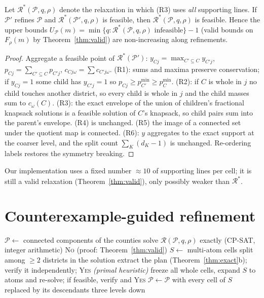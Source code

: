 \begin{theorem}\label{thm:mono}
Let $\mathcal R^*(\mathcal P,q,\rho)$ denote the relaxation in which (R3) uses \emph{all} supporting lines. If $\mathcal P'$ refines $\mathcal P$ and $\mathcal R^*(\mathcal P',q,\rho)$ is feasible, then $\mathcal R^*(\mathcal P,q,\rho)$ is feasible. Hence the upper bounds $U_{\mathcal P}(m)=\min\{q:\mathcal R^*(\mathcal P,q,\rho)\text{ infeasible}\}-1$ (valid bounds on $F_\rho(m)$ by Theorem~\ref{thm:valid}) are non-increasing along refinements.
\end{theorem}
\begin{proof}
Aggregate a feasible point of $\mathcal R^*(\mathcal P')$: $y_{Cj}=\max_{C'\subseteq C}y_{C'j}$, $p_{Cj}=\sum_{C'\subseteq C}p_{C'j}$, $c_{Cj\omega}=\sum c_{C'j\omega}$. (R1): sums and maxima preserve conservation; if $y_{Cj}=1$ some child has $y_{C'j}=1$ so $p_{Cj}\ge p^{\min}_{C'}\ge p^{\min}_C$. (R2): if $C$ is whole in $j$ no child touches another district, so every child is whole in $j$ and the child masses sum to $c_\omega(C)$. (R3): the exact envelope of the union of children's fractional knapsack solutions is a feasible solution of $C$'s knapsack, so child pairs sum into the parent's envelope. (R4) is unchanged. (R5) the image of a connected set under the quotient map is connected. (R6): $y$ aggregates to the exact support at the coarser level, and the split count $\sum_K(d_K-1)$ is unchanged. Re-ordering labels restores the symmetry breaking.
\end{proof}
Our implementation uses a fixed number $\approx10$ of supporting lines per cell; it is still a valid relaxation (Theorem~\ref{thm:valid}), only possibly weaker than $\mathcal R^*$.

\section{Counterexample-guided refinement}\label{sec:cegar}

\begin{algorithm}[t]
\caption{CEGAR decision procedure for ``$F_\rho(m)\ge q$?''}\label{alg:cegar}
\begin{algorithmic}[1]
\State $\mathcal P\gets$ connected components of the counties
\Loop
  \State solve $\mathcal R(\mathcal P,q,\rho)$ exactly (CP-SAT, integer arithmetic)
   \Return \textsc{No} (proof: Theorem~\ref{thm:valid})
  \EndIf
  \State $S\gets$ multi-atom cells split among $\ge2$ districts in the solution
   extract the plan (Theorem~\ref{thm:exact}b); verify it independently; \Return \textsc{Yes}
  \EndIf
  \State \emph{(primal heuristic)} freeze all whole cells, expand $S$ to atoms and re-solve; if feasible, verify and \Return \textsc{Yes}
  \State $\mathcal P\gets\mathcal P$ with every cell of $S$ replaced by its descendants three levels down
\EndLoop
\end{algorithmic}
\end{algorithm}

